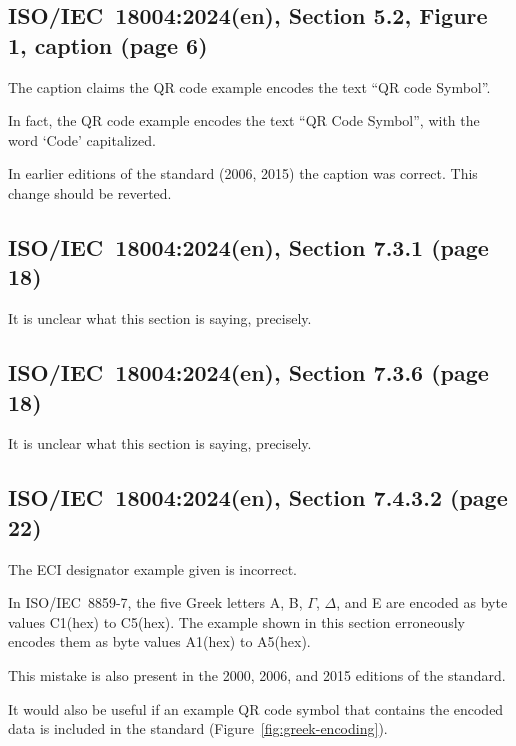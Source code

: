 \documentclass[a4paper,twoside]{article}
\newcommand{\shortstandard}{ISO/IEC~18004}
\newcommand{\standard}{\shortstandard:2024(en)}
\newcommand{\hex}[1]{#1(hex)}
\begin{document}
\subsection{\standard, Section 5.2, Figure 1, caption (page 6)}

The caption claims the QR code example encodes the text ``QR code Symbol''.

In fact, the QR code example encodes the text ``QR Code Symbol'', with the word `Code' capitalized.

In earlier editions of the standard (2006, 2015) the caption was correct. This change should be reverted.

\subsection{\standard, Section 7.3.1 (page 18)}

It is unclear what this section is saying, precisely.

\subsection{\standard, Section 7.3.6 (page 18)}

It is unclear what this section is saying, precisely.

\subsection{\standard, Section 7.4.3.2 (page 22)}

The ECI designator example given is incorrect.

In ISO/IEC~8859-7, the five Greek letters A, B, $\Gamma$, $\Delta$, and E are encoded as byte values \hex{C1} to \hex{C5}.
The example shown in this section erroneously encodes them as byte values \hex{A1} to \hex{A5}.

This mistake is also present in the 2000, 2006, and 2015 editions of the standard.

It would also be useful if an example QR code symbol that contains the encoded data is included in the standard (Figure~\ref{fig:greek-encoding}).
\end{document}
